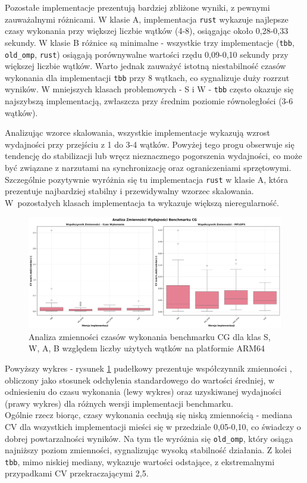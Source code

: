 Pozostałe implementacje prezentują bardziej zbliżone wyniki, z pewnymi zauważalnymi różnicami. W klasie A, implementacja \texttt{rust} wykazuje najlepsze czasy wykonania przy większej liczbie wątków (4-8), osiągając około 0,28-0,33 sekundy. W klasie B różnice są minimalne - wszystkie trzy implementacje (\texttt{tbb}, \texttt{old\_omp}, \texttt{rust}) osiągają porównywalne wartości rzędu 0,09-0,10 sekundy przy większej liczbie wątków. Warto jednak zauważyć istotną niestabilność czasów wykonania dla implementacji \texttt{tbb} przy 8 wątkach, co sygnalizuje duży rozrzut wyników. W mniejszych klasach problemowych - S i W - \texttt{tbb} często okazuje się najszybszą implementacją, zwłaszcza przy średnim poziomie równoległości (3-6 wątków).

Analizując wzorce skalowania, wszystkie implementacje wykazują wzrost wydajności przy przejściu z 1 do 3-4 wątków. Powyżej tego progu obserwuje się tendencję do stabilizacji lub wręcz nieznacznego pogorszenia wydajności, co może być związane z narzutami na synchronizację oraz ograniczeniami sprzętowymi. Szczególnie pozytywnie wyróżnia się tu implementacja \texttt{rust} w klasie A, która prezentuje najbardziej stabilny i przewidywalny wzorzec skalowania. W~pozostałych klasach implementacja ta wykazuje większą nieregularność.

\begin{figure}[H]
    \centering
    \includegraphics[width=\textwidth]{analiza/images/parallel/cg/arm/cg_analiza_zmiennosci.png}
    \caption{Analiza zmienności czasów wykonania benchmarku CG dla klas S, W, A, B względem liczby użytych wątków na platformie ARM64}
    \label{cg_analiza_zmiennosci}
\end{figure}
Powyższy wykres - rysunek \ref{cg_analiza_zmiennosci} pudełkowy prezentuje współczynnik zmienności \mbox{}, obliczony jako stosunek odchylenia standardowego do wartości średniej, w odniesieniu do czasu wykonania (lewy wykres) oraz uzyskiwanej wydajności (prawy wykres) dla różnych wersji implementacji benchmarku.\\
Ogólnie rzecz biorąc, czasy wykonania cechują się niską zmiennością - mediana CV dla wszystkich implementacji mieści się w przedziale 0,05-0,10, co świadczy o dobrej powtarzalności wyników. Na tym tle wyróżnia się \texttt{old\_omp}, który osiąga najniższy poziom zmienności, sygnalizując wysoką stabilność działania. Z kolei \texttt{tbb}, mimo niskiej mediany, wykazuje wartości odstające, z ekstremalnymi przypadkami CV przekraczającymi 2,5.

